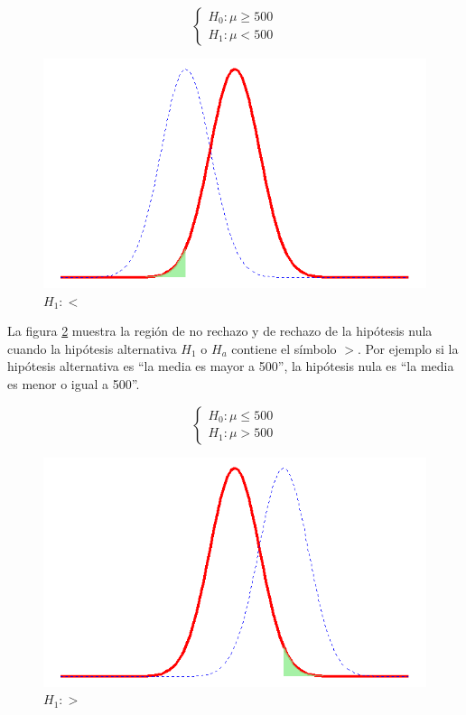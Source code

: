 \documentclass[letterpaper,]{book}
\begin{document}
\begin{equation} 
\begin{cases} 
H_0: \mu \geq 500 \\ 
H_1: \mu < 500
\end{cases} 
\end{equation}

\begin{figure}[!h]

{\centering \includegraphics[width=0.6\linewidth]{phless} 

}

\caption{$H_1:<$}\label{fig:phless}
\end{figure}

La figura \ref{fig:phmore} muestra la región de no rechazo y de rechazo de la hipótesis nula cuando la hipótesis alternativa \(H_1\) o \(H_a\) contiene el símbolo \(>\). Por ejemplo si la hipótesis alternativa es ``la media es mayor a 500'', la hipótesis nula es ``la media es menor o igual a 500''.

\begin{equation} 
\begin{cases} 
H_0: \mu \leq 500 \\ 
H_1: \mu > 500
\end{cases} 
\end{equation}

\begin{figure}[!h]

{\centering \includegraphics[width=0.6\linewidth]{phmore} 

}

\caption{$H_1:>$}\label{fig:phmore}
\end{figure}
\end{document}
